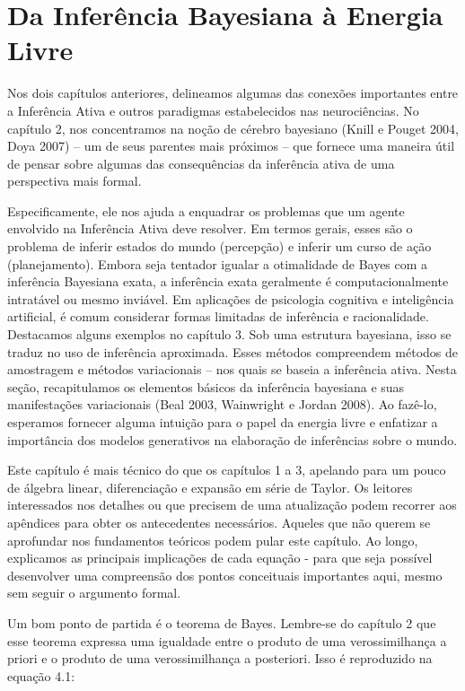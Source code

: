 \documentclass[
  12pt,
]{book}
\begin{document}
\hypertarget{da-inferuxeancia-bayesiana-uxe0-energia-livre}{%
\section{Da Inferência Bayesiana à Energia Livre}\label{da-inferuxeancia-bayesiana-uxe0-energia-livre}}

Nos dois capítulos anteriores, delineamos algumas das conexões
importantes entre a Inferência Ativa e outros paradigmas estabelecidos
nas neurociências. No capítulo 2, nos concentramos na noção de cérebro
bayesiano (Knill e Pouget 2004, Doya 2007) -- um de seus parentes mais
próximos -- que fornece uma maneira útil de pensar sobre algumas das
consequências da inferência ativa de uma perspectiva mais formal.

Especificamente, ele nos ajuda a enquadrar os problemas que um agente
envolvido na Inferência Ativa deve resolver. Em termos gerais, esses são
o problema de inferir estados do mundo (percepção) e inferir um curso de
ação (planejamento). Embora seja tentador igualar a otimalidade de Bayes
com a inferência Bayesiana exata, a inferência exata geralmente é
computacionalmente intratável ou mesmo inviável. Em aplicações de
psicologia cognitiva e inteligência artificial, é comum considerar
formas limitadas de inferência e racionalidade. Destacamos alguns
exemplos no capítulo 3. Sob uma estrutura bayesiana, isso se traduz no
uso de inferência aproximada. Esses métodos compreendem métodos de
amostragem e métodos variacionais -- nos quais se baseia a inferência
ativa. Nesta seção, recapitulamos os elementos básicos da inferência
bayesiana e suas manifestações variacionais (Beal 2003, Wainwright e
Jordan 2008). Ao fazê-lo, esperamos fornecer alguma intuição para o
papel da energia livre e enfatizar a importância dos modelos generativos
na elaboração de inferências sobre o mundo.

Este capítulo é mais técnico do que os capítulos 1 a 3, apelando para um
pouco de álgebra linear, diferenciação e expansão em série de Taylor. Os
leitores interessados nos detalhes ou que precisem de uma atualização
podem recorrer aos apêndices para obter os antecedentes necessários.
Aqueles que não querem se aprofundar nos fundamentos teóricos podem
pular este capítulo. Ao longo, explicamos as principais implicações de
cada equação - para que seja possível desenvolver uma compreensão dos
pontos conceituais importantes aqui, mesmo sem seguir o argumento
formal.

Um bom ponto de partida é o teorema de Bayes. Lembre-se do capítulo 2
que esse teorema expressa uma igualdade entre o produto de uma
verossimilhança a priori e o produto de uma verossimilhança a
posteriori. Isso é reproduzido na equação 4.1:
\end{document}

